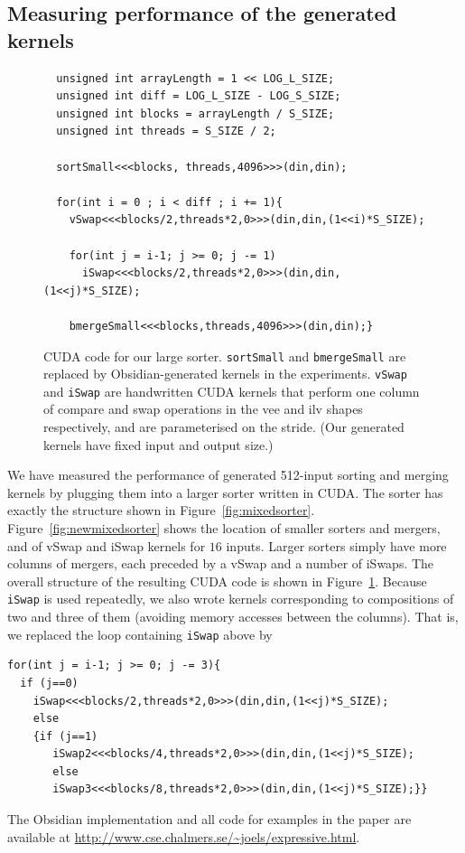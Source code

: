 \documentclass[]{sigplanconf}
\begin{document}
\subsection{Measuring performance of the generated kernels}\label{sec:benchmarks}
\begin{figure}
\begin{codesize}
\begin{verbatim}
  unsigned int arrayLength = 1 << LOG_L_SIZE;
  unsigned int diff = LOG_L_SIZE - LOG_S_SIZE;
  unsigned int blocks = arrayLength / S_SIZE;
  unsigned int threads = S_SIZE / 2;
  
  sortSmall<<<blocks, threads,4096>>>(din,din);
 
  for(int i = 0 ; i < diff ; i += 1){ 
    vSwap<<<blocks/2,threads*2,0>>>(din,din,(1<<i)*S_SIZE);
     
    for(int j = i-1; j >= 0; j -= 1)
      iSwap<<<blocks/2,threads*2,0>>>(din,din,(1<<j)*S_SIZE);
      
    bmergeSmall<<<blocks,threads,4096>>>(din,din);}
\end{verbatim}
\end{codesize}
\caption{CUDA code for our large sorter. {\tt sortSmall} and {\tt bmergeSmall}
are replaced by Obsidian-generated kernels in the experiments. {\tt vSwap} and {\tt iSwap} are handwritten CUDA kernels
that perform one column of compare and swap operations in the vee and ilv shapes respectively, and are
parameterised on the stride. (Our generated kernels have fixed input and output size.)}
\label{fig:CUDAsort}
\end{figure}
We have measured the performance of generated 512-input sorting and merging kernels by plugging them into a larger sorter written in CUDA.
The sorter has exactly the structure shown in Figure~\ref{fig:mixedsorter}.
Figure~\ref{fig:newmixedsorter} shows the location of smaller sorters and mergers, and of vSwap and iSwap kernels for $16$ inputs.
Larger sorters simply have more columns of mergers, each preceded by a vSwap and a number of iSwaps.
The overall structure of the resulting CUDA code is shown in Figure~\ref{fig:CUDAsort}.
Because {\tt iSwap} is used repeatedly, we also wrote kernels
corresponding to compositions of two and three of them (avoiding
memory accesses between the columns).
That is, we replaced the loop containing {\tt iSwap} above by
\pagebreak
\begin{codesize}
\begin{verbatim}
for(int j = i-1; j >= 0; j -= 3){ 
  if (j==0) 
    iSwap<<<blocks/2,threads*2,0>>>(din,din,(1<<j)*S_SIZE);
    else 
    {if (j==1) 
       iSwap2<<<blocks/4,threads*2,0>>>(din,din,(1<<j)*S_SIZE);
       else 
       iSwap3<<<blocks/8,threads*2,0>>>(din,din,(1<<j)*S_SIZE);}}
\end{verbatim}
\end{codesize}
\noindent
The Obsidian implementation and all code for examples in the paper are available at \url{http://www.cse.chalmers.se/~joels/expressive.html}.
\end{document}

